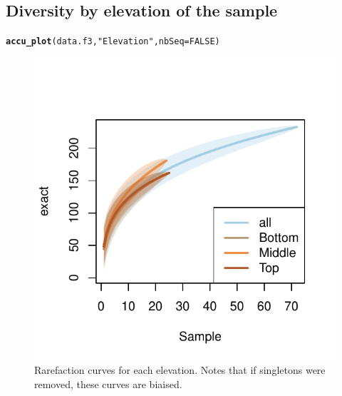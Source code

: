 \documentclass[12pt]{article}\usepackage[]{graphicx}\usepackage[]{color}
\makeatletter
\def\maxwidth{ %
  \ifdim\Gin@nat@width>\linewidth
    \linewidth
  \else
    \Gin@nat@width
  \fi
}
\newcommand{\hlnum}[1]{\textcolor[rgb]{0.686,0.059,0.569}{#1}}%
\newcommand{\hlstr}[1]{\textcolor[rgb]{0.192,0.494,0.8}{#1}}%
\newcommand{\hlstd}[1]{\textcolor[rgb]{0.345,0.345,0.345}{#1}}%
\newcommand{\hlkwc}[1]{\textcolor[rgb]{0.333,0.667,0.333}{#1}}%
\newcommand{\hlkwd}[1]{\textcolor[rgb]{0.737,0.353,0.396}{\textbf{#1}}}%
\newenvironment{kframe}{%
 \def\at@end@of@kframe{}%
 \ifinner\ifhmode%
  \def\at@end@of@kframe{\end{minipage}}%
  \begin{minipage}{\columnwidth}%
 \fi\fi%
 \def\FrameCommand##1{\hskip\@totalleftmargin \hskip-\fboxsep
 \colorbox{shadecolor}{##1}\hskip-\fboxsep
     \hskip-\linewidth \hskip-\@totalleftmargin \hskip\columnwidth}%
 \MakeFramed {\advance\hsize-\width
   \@totalleftmargin\z@ \linewidth\hsize
   \@setminipage}}%
 {\par\unskip\endMakeFramed%
 \at@end@of@kframe}
\newenvironment{knitrout}{}{} %
\numberwithin{figure}{section}
\makeatother
\begin{document}
  \subsection{Diversity by elevation of the sample}

\begin{knitrout}\small
{}\color{fgcolor}\begin{kframe}
\begin{alltt}
\hlkwd{accu_plot}\hlstd{(data.f3,} \hlstr{"Elevation"}\hlstd{,} \hlkwc{nbSeq} \hlstd{=} \hlnum{FALSE}\hlstd{)}
\end{alltt}
\end{kframe}\begin{figure}

{\centering \includegraphics[width=\maxwidth]{figure/unnamed-chunk-40-1} 

}

\caption[Rarefaction curves for each elevation]{Rarefaction curves for each elevation. Notes that if singletons were removed, these curves are biaised.}\label{fig:unnamed-chunk-40}
\end{figure}


\end{knitrout}
\end{document}
